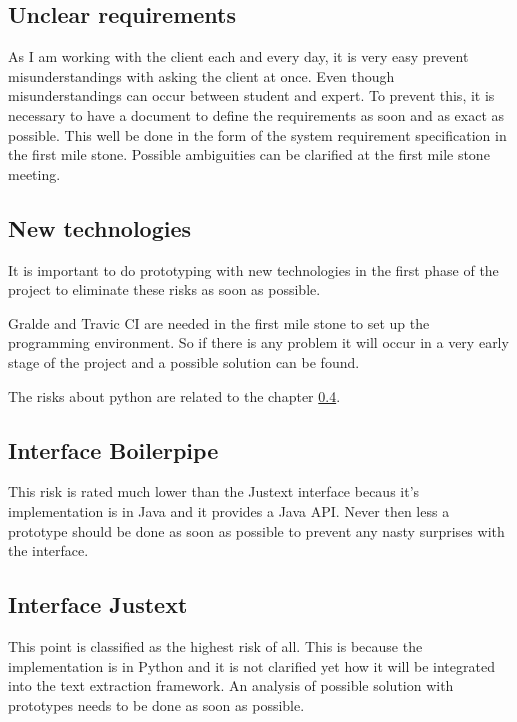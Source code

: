 \subsection{Unclear requirements}

As I am working with the client each and every day, it is very easy prevent misunderstandings with asking the client at once. Even though misunderstandings can occur between student and expert. To prevent this, it is necessary to have a document to define the requirements as soon and as exact as possible. This well be done in the form of the system requirement specification in the first mile stone. Possible ambiguities can be clarified at the first mile stone meeting.

\subsection{New technologies}

It is important to do prototyping with new technologies in the first phase of the project to eliminate these risks as soon as possible.

Gralde and Travic CI are needed in the first mile stone to set up the programming environment. So if there is any problem it will occur in a very early stage of the project and a possible solution can be found.

The risks about python are related to the chapter \ref{subsec:Interface Justext}.

\subsection{Interface Boilerpipe}

This risk is rated much lower than the Justext interface becaus it's implementation is in Java and it provides a Java API. Never then less a prototype should be done as soon as possible to prevent any nasty surprises with the interface.

\subsection{Interface Justext}
\label{subsec:Interface Justext}

This point is classified as the highest risk of all. This is because the implementation is in Python and it is not clarified yet how it will be integrated into the text extraction framework. An analysis of possible solution with prototypes needs to be done as soon as possible.

